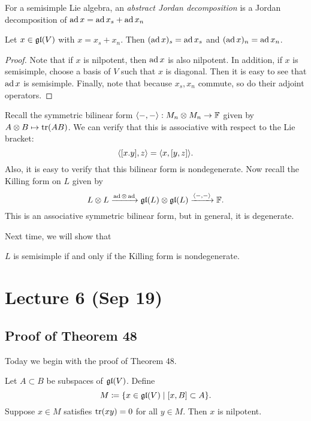 \documentclass[twoside, 10pt]{article}
\newcommand{\F}{\mathbb{F}}
\begin{document}
    \begin{defn}
        For a semisimple Lie algebra, an \textit{abstract Jordan decomposition} is a Jordan decomposition of $\operatorname{ad} x = \operatorname{ad} x_s + \operatorname{ad} x_n$
    \end{defn}

    \begin{cor}
        Let $x \in \mathfrak{gl}(V)$ with $x=x_s+x_n$. Then $(\operatorname{ad} x)_s = \operatorname{ad} x_s$ and $(\operatorname{ad} x)_n = \operatorname{ad} x_n$.
    \end{cor}

    \begin{proof}
        Note that if $x$ is nilpotent, then $\operatorname{ad} x$ is also nilpotent. In addition, if $x$ is semisimple, choose a basis of $V$ such that $x$ is diagonal. Then it is easy to see that $\operatorname{ad} x$ is semisimple. Finally, note that because $x_s,x_n$ commute, so do their adjoint operators.
    \end{proof}

    Recall the symmetric bilinear form $\gen{-,-}: M_n \otimes M_n \to \F$ given by $A \otimes B \mapsto \operatorname{tr}(AB)$. We can verify that this is associative with respect to the Lie bracket:
    \[\langle[x.y],z\rangle = \langle x,[y,z]\rangle.\]
    Also, it is easy to verify that this bilinear form is nondegenerate. Now recall the Killing form on $L$ given by \[L \otimes L \xrightarrow{\ad \otimes \ad} \mf{gl}(L) \otimes \mf{gl}(L) \xrightarrow{\gen{-,-}} \F.\]
    This is an associative symmetric bilinear form, but in general, it is degenerate.
    
    Next time, we will show that

    \begin{thm}
        $L$ is semisimple if and only if the Killing form is nondegenerate.
    \end{thm}

    \section{Lecture 6 (Sep 19)}%
    \label{sec:lecture_6_sep_19_}
    
    \subsection{Proof of Theorem 48}%
    \label{sub:proof_of_theorem_48}

    Today we begin with the proof of Theorem 48.

    \begin{lem}
        Let $A \subset B$ be subspaces of $\mathfrak{gl}(V)$. Define \[ M \coloneqq \{ x \in \mathfrak{gl}(V) \mid [x,B] \subset A\}.\] Suppose $x \in M$ satisfies $\operatorname{tr}(xy) = 0$ for all $y \in M$. Then $x$ is nilpotent.
    \end{lem}
\end{document}
